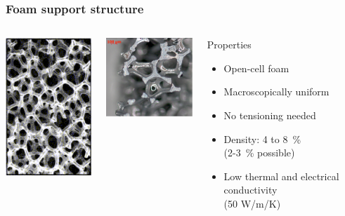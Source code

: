 \documentclass{beamer}
\begin{document}

\begin{frame}
  \frametitle{Foam support structure}

  \vspace{-0.6cm}
  \begin{columns}[t]

    \begin{column}{4cm}
      \begin{center}
        \includegraphics[width = 4cm]{Pictures/foam1.png}
      \end{center}
    \end{column}

    \begin{column}{4cm}
      \begin{center}
        \includegraphics[width = 4cm]{Pictures/foam2.png}
      \end{center}
    \end{column}

    \begin{column}{4cm}
      \vspace{-0.2cm}
      \begin{center}
        \begin{block}{Properties}
          \begin{itemize}
            \item Open-cell foam
            \item Macroscopically uniform
            \item No tensioning needed
            \item Density: 4 to 8~\% \\ (2-3~\% possible)
            \item Low thermal and electrical conductivity \\ (50 W/m/K)
          \end{itemize}
        \end{block}
      \end{center}
    \end{column}


\end{columns}
\end{frame}
\end{document}
